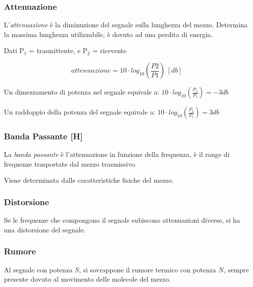         \subsubsection{Attenuazione}
            L'\textit{attenuazione} è la diminuzione del segnale sulla lunghezza del mezzo. Determina la massima lunghezza utilizzabile, è dovuto ad una perdita di energia.

            Dati P$_1$ = trasmittente, e P$_2$ = ricevente

            \begin{equation*}
                attenuazione = 10 \cdot log_{10} \left( \frac{P2}{P1}\right) ~ [db]
            \end{equation*}

            Un dimezzamento di potenza nel segnale equivale a:
            \begin{math}
                10 \cdot log_{10} \left( \frac{P_2}{P_1}\right) = -3db
            \end{math}

            Un raddoppio della potenza del segnale equivale a:
            \begin{math}
                10 \cdot log_{10} \left( \frac{P_2}{P_1}\right) = 3db
            \end{math}

        \subsubsection{Banda Passante [H]}
            La \textit{banda passante} è l'attenuazione in funzione della frequenza, è il range di frequenze trasportate dal mezzo trasmissivo.
        
            Viene determinata dalle caratteristiche fisiche del mezzo.

        \subsubsection{Distorsione}
            Se le frequenze che compongono il segnale subiscono attenuazioni diverse, si ha una distorsione del segnale.

        \subsubsection{Rumore}
            Al segnale con potenza $S$, si sovrappone il rumore termico con potenza $N$, sempre presente dovuto al movimento delle molecole del mezzo.
        
